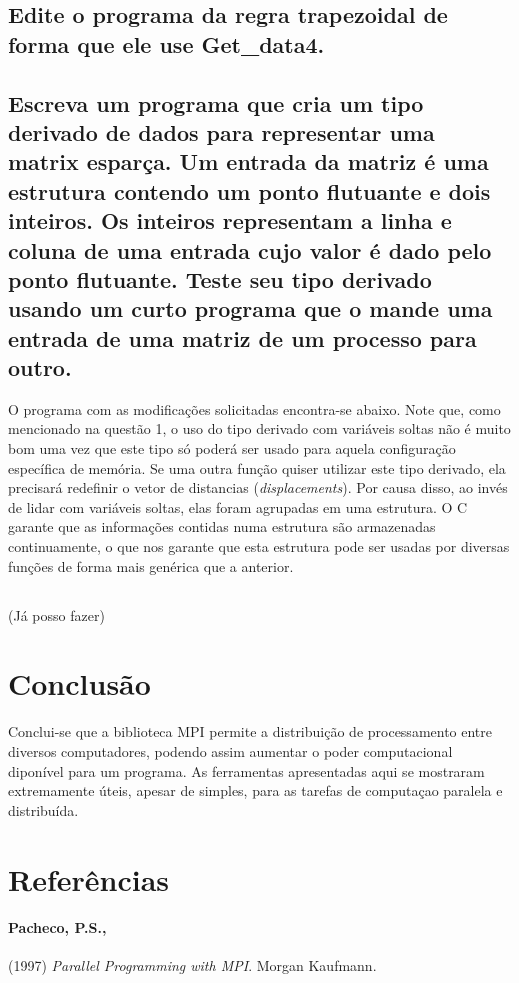 \documentclass[11pt,a4paper,onecolumn]{article}
\begin{document}
\subsection{Edite o programa da regra trapezoidal de forma que ele use Get\_data4.}
%

\subsection{Escreva um programa que cria um tipo derivado de dados para representar uma matrix esparça. Um entrada da matriz é uma estrutura contendo um ponto flutuante e dois inteiros. Os inteiros representam a linha e coluna de uma entrada cujo valor é dado pelo ponto flutuante. Teste seu tipo derivado usando um curto programa que o mande uma entrada de uma matriz de um processo para outro.}
O programa com as modificações solicitadas encontra-se abaixo.
Note que, como mencionado na questão 1, o uso do tipo derivado com variáveis soltas não é muito bom uma vez que este tipo só poderá ser usado para aquela configuração específica de memória.
Se uma outra função quiser utilizar este tipo derivado, ela precisará redefinir o vetor de distancias (\textit{displacements}).
Por causa disso, ao invés de lidar com variáveis soltas, elas foram agrupadas em uma estrutura.
O C garante que as informações contidas numa estrutura são armazenadas continuamente, o que nos garante que esta estrutura pode ser usadas por diversas funções de forma mais genérica que a anterior.


\subsection{} (Já posso fazer)

\section{Conclusão}
Conclui-se que a biblioteca MPI permite a distribuição de processamento entre diversos computadores, podendo assim aumentar o poder computacional diponível para um programa.
As ferramentas apresentadas aqui se mostraram extremamente úteis, apesar de simples, para as tarefas de computaçao paralela e distribuída.

\section{Referências}
\paragraph{Pacheco, P.S.,} (1997) \textit{Parallel Programming with MPI}. Morgan Kaufmann.
\end{document}
